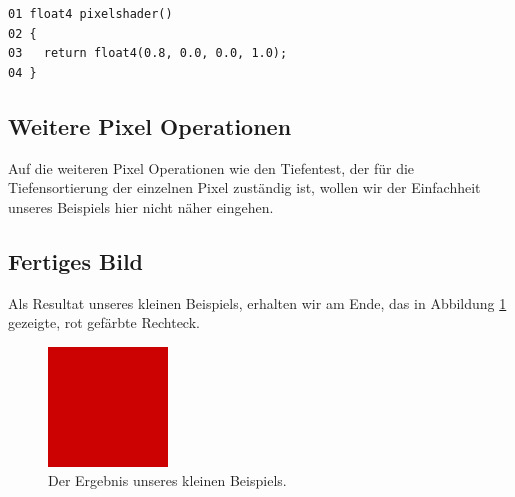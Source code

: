 \begin{Spacing}{\mylinespace}
\begin{lstlisting}[captionpos=b, caption=Fragment Shader unseres Rechtecks., label=pixelshader]
01 float4 pixelshader()
02 {
03   return float4(0.8, 0.0, 0.0, 1.0);
04 }
\end{lstlisting}

\subsection{Weitere Pixel Operationen}
Auf die weiteren Pixel Operationen wie den Tiefentest, der für die Tiefensortierung der einzelnen Pixel zuständig ist, wollen wir der Einfachheit unseres Beispiels hier nicht näher eingehen.

\subsection{Fertiges Bild}
Als Resultat unseres kleinen Beispiels, erhalten wir am Ende, das in Abbildung \ref{fig:exampleRes} gezeigte, rot gefärbte Rechteck.

\begin{figure}[h!]
	\vspace*{15px}
	\centering
	\includegraphics[height=120px]{graphics/exampleRes.png}	
	\caption{Der Ergebnis unseres kleinen Beispiels.}
	\label{fig:exampleRes}
\end{figure}

\end{Spacing}
\clearpage
